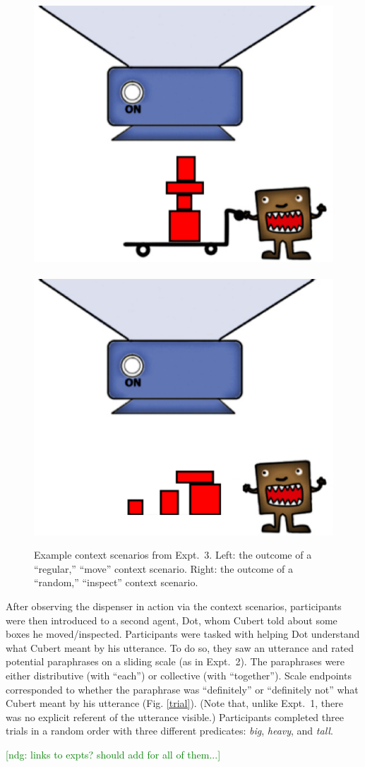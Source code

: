 \documentclass[linguex]{sp}
\newcommand{\ndg}[1]{\textcolor{Green}{[ndg: #1]}}
\begin{document}
\begin{figure}[h]
\centering
\includegraphics[width=.45\textwidth]{images/context13reg.eps}
\ \ \ \ 
\includegraphics[width=.45\textwidth]{images/context13nodolly.eps}
\caption{Example context scenarios from Expt.~3. Left: the outcome of a ``regular,'' ``move'' context scenario. Right: the outcome of a ``random,'' ``inspect'' context scenario.\label{expt2context}}
\end{figure}


After observing the dispenser in action via the context  scenarios, participants were then introduced to a second agent, Dot, whom Cubert told about some boxes he moved/inspected. Participants were tasked with helping Dot understand what Cubert meant by his utterance. To do so, they saw an utterance and rated potential paraphrases on a sliding scale (as in Expt.~2). The paraphrases were either distributive (with  ``each'') or collective (with ``together'').  Scale endpoints corresponded to whether the paraphrase was ``definitely'' or ``definitely not'' what Cubert meant by his utterance (Fig. \ref{trial}). (Note that, unlike Expt.~1, there was no explicit referent of the utterance visible.) Participants completed three trials in a random order with three different predicates: \emph{big}, \emph{heavy}, and \emph{tall}.


\ndg{links to expts? should add for all of them...}
\end{document}
